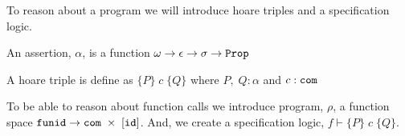 To reason about a program we will introduce hoare triples and a specification logic.

An assertion, $\alpha$, is a function $\omega \rightarrow \epsilon \rightarrow \sigma \rightarrow \verb|Prop|$ 

A hoare triple is define as $\{P\}\;c\;\{Q\}$ where $P,\;Q : \alpha$ and $c : \verb|com|$

To be able to reason about function calls we introduce program, $\rho$, a function space $\verb|funid| \rightarrow \verb|com| \;\times\; [\verb|id|] $. And, we create a specification logic, $f \vdash \{P\} \; c \; \{Q\}$.
